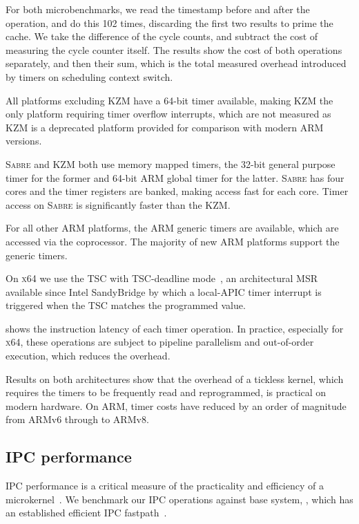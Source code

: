 For both microbenchmarks, we read the timestamp before and after the operation, and do this 102
times, discarding the first two results to prime the cache.  We take the difference of the cycle
counts, and subtract the cost of measuring the cycle counter itself. The results show the cost of
both operations separately, and then their sum, which is the total measured overhead introduced by timers on
scheduling context switch.

All platforms excluding \textsc{KZM} have a 64-bit timer available, making \textsc{KZM} the only
platform requiring timer overflow interrupts, which are not measured as \textsc{KZM} is a deprecated
platform provided for comparison with modern ARM versions.

\textsc{Sabre} and \textsc{KZM} both use memory mapped timers, the 32-bit general purpose timer for
the former and 64-bit ARM global timer for the latter. \textsc{Sabre} has four cores and the timer
registers are banked, making access fast for each core. Timer access on \textsc{Sabre} is
significantly faster than the \textsc{KZM}. 

For all other ARM platforms, the ARM generic timers are available, which are accessed via the
coprocessor. The majority of new ARM platforms support the generic timers. 

On \textsc{x64} we use the \gls{TSC} with \gls{TSC}-deadline
mode~\citep{Intel_64_IA-32:asdmspg_325384}, an architectural \gls{MSR} available since
Intel SandyBridge by which a local-APIC timer interrupt is triggered when the \gls{TSC} matches the
programmed value. 

 shows the instruction latency of each timer operation. In practice, especially
for \textsc{x64}, these operations are subject to pipeline parallelism and out-of-order execution, which
reduces the overhead.

Results on both architectures show that the overhead of a tickless kernel, which requires the timers
to be frequently read and reprogrammed, is practical on modern hardware. On ARM, timer costs have
reduced by an order of magnitude from ARMv6 through to ARMv8. 

\subsection{IPC performance}

\Gls{IPC} performance is a critical measure of the practicality and efficiency of a
microkernel~\citep{Liedtke_95}. We benchmark our \gls{IPC} operations against base system, \selfour,
which has an established efficient \gls{IPC} fastpath~\citep{Elphinstone_Heiser_13}. 

